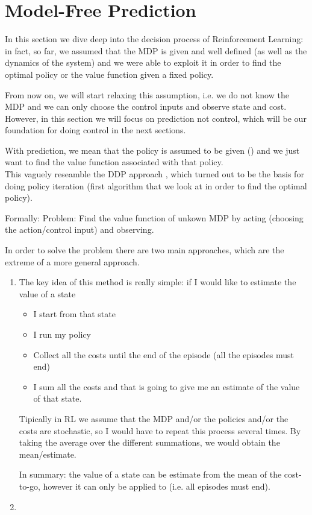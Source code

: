 \section{Model-Free Prediction}
In this section we dive deep into the decision process of Reinforcement Learning: in fact, so far, we assumed that the MDP is given and well defined (as well as the dynamics of the system) and we were able to exploit it in order to find the optimal policy or the value function given a fixed policy.

From now on, we will start relaxing this assumption, i.e. we do not know the MDP and we can only choose the control inputs and observe state and cost.\\
However, in this section we will focus on prediction not control, which will be our foundation for doing control in the next sections.

With prediction, we mean that the policy is assumed to be given () and we just want to find the value function associated with that policy.\\
This vaguely reseamble the DDP approach , which turned out to be the basis for doing policy iteration (first algorithm that we look at in order to find the optimal policy).

Formally:
Problem: Find the value function of unkown MDP by acting (choosing the action/control input) and observing. 

In order to solve the problem there are two main approaches, which are the extreme of a more general approach.
\begin{enumerate}
\item {}

The key idea of this method is really simple: if I would like to estimate the value of a state
\begin{itemize}
\item I start from that state
\item I run my policy
\item Collect all the costs until the end of the episode (all the episodes must end)
\item I sum all the costs and that is going to give me an estimate of the value of that state.
\end{itemize}

Tipically in RL we assume that the MDP and/or the policies and/or the costs are stochastic, so I would have to repeat this process several times. By taking the average over the different summations, we would obtain the mean/estimate.

In summary: the value of a state can be estimate from the mean of the cost-to-go, however it can only be applied to  (i.e. all episodes must end).
\item {}
\end{enumerate}


